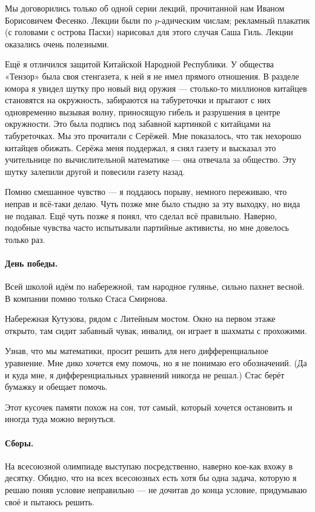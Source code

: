 \documentclass{book}
\begin{document}
Мы договорились только об одной серии лекций, прочитанной нам Иваном Борисовичем Фесенко.
Лекции были по $p$-адическим числам; 
рекламный плакатик (с головами с острова Пасхи) нарисовал для этого случая Саша Гиль.
Лекции оказались очень полезными.

Ещё я отличился защитой Китайской Народной Республики.
У общества «Тензор» была своя стенгазета, к ней я не имел прямого отношения.
В разделе юмора я увидел шутку про новый вид оружия --- столько-то миллионов китайцев становятся на окружность, забираются на табуреточки и прыгают с них одновременно вызывая волну, приносящую гибель и разрушения в центре окружности.
Это была подпись под забавной картинкой с китайцами на табуреточках.
Мы это прочитали с Серёжей.
Мне показалось, что так нехорошо китайцев обижать.
Серёжа меня поддержал, я снял газету и высказал это учительнице по вычислительной математике --- она отвечала за общество.
Эту шутку залепили другой и повесили газету назад.

Помню смешанное чувство --- я поддаюсь порыву, немного переживаю, что неправ и всё-таки делаю.
Чуть позже мне было стыдно за эту выходку, но вида не подавал.
Ещё чуть позже я понял, что сделал всё правильно.
Наверно, подобные чувства часто испытывали партийные активисты, но мне довелось только раз.

\paragraph{День победы.} 
Всей школой идём по набережной, там народное гулянье, сильно пахнет весной.
В компании помню только Стаса Смирнова.

Набережная Кутузова, рядом с Литейным мостом.
Окно на первом этаже открыто,
там сидит забавный чувак, инвалид, он играет в шахматы с прохожими.

Узнав, что мы математики, просит решить для него дифференциальное уравнение.
Мне дико хочется ему помочь, но я не понимаю его обозначений.
(Да и куда мне, я дифференциальных уравнений никогда не решал.)
Стас берёт бумажку и обещает помочь.

Этот кусочек памяти похож на сон, 
тот самый, который хочется остановить и иногда туда можно вернуться.


\paragraph{Сборы.} На всесоюзной олимпиаде выступаю посредственно,
наверно кое-как вхожу в десятку.
Обидно, что на всех всесоюзных есть хотя бы одна задача,
которую я решаю поняв условие неправильно --- не дочитав до конца условие, придумываю своё и пытаюсь решить.
\end{document}
